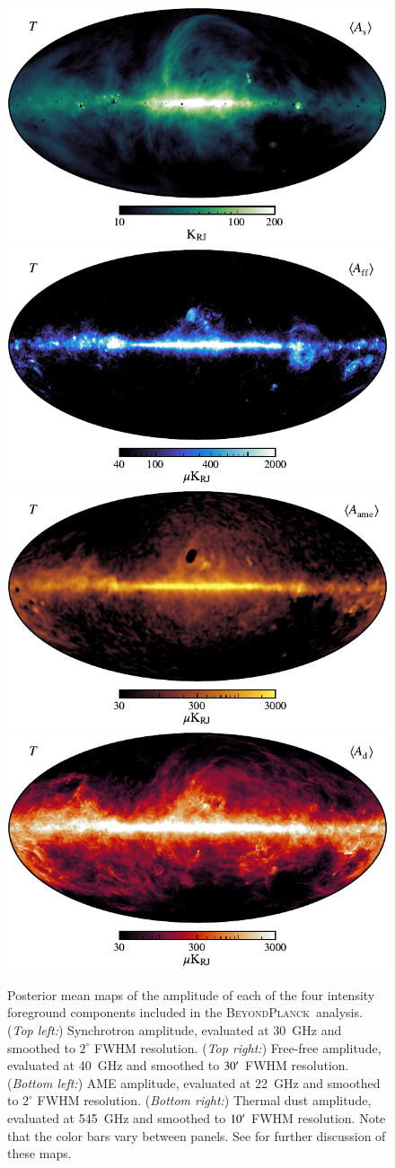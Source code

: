 \documentclass[twocolumn]{aa}
\newcommand{\BP}{\textsc{BeyondPlanck}}
\begin{document}
\begin{figure}[t]
  \center
  \includegraphics[width=0.49\linewidth]{figs/BP_synch_v2_I_MEAN_w12_n1024_cb_c-swamp.pdf}
  \includegraphics[width=0.49\linewidth]{figs/BP_freefree_v2_I_MEAN_w12_n1024_cb_c-freeze.pdf}\\
  \includegraphics[width=0.49\linewidth]{figs/BP_ame_v2_I_MEAN_w12_n1024_cb_c-amber.pdf}
  \includegraphics[width=0.49\linewidth]{figs/BP_dust_v2_I_MEAN_w12_n1024_cb_c-sunburst.pdf}
  \caption{
    Posterior mean maps of the amplitude of each of the four intensity
    foreground components included in the \BP\ analysis. (\emph{Top left:})
    Synchrotron amplitude, evaluated at 30~GHz and smoothed to $2^{\circ}$ FWHM
    resolution.  (\emph{Top right:}) Free-free amplitude, evaluated at 40~GHz
    and smoothed to $30^\prime$ FWHM resolution. (\emph{Bottom left:}) AME
    amplitude, evaluated at 22~GHz and smoothed to $2^{\circ}$ FWHM resolution.
    (\emph{Bottom right:}) Thermal dust amplitude, evaluated at 545~GHz and smoothed to $10^\prime$ FWHM resolution. Note that the color bars vary between panels. See \citet{bp13} for further discussion of these maps.
  }\label{fig:fg_temp}
\end{figure}
\end{document}
